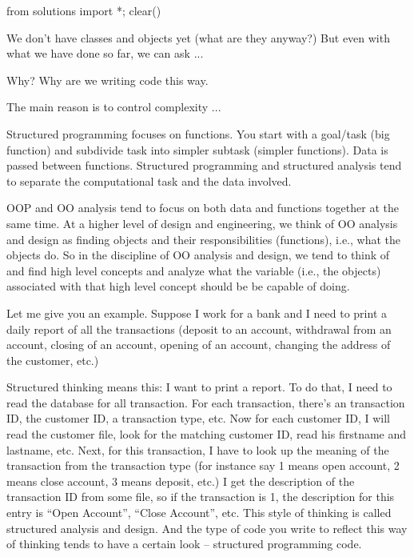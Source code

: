 \begin{python0}
from solutions import *; clear()
\end{python0}

We don't have classes and objects yet (what are they
anyway?) But even with what we have done so far, we can ask ...

Why? Why are we writing code this way.

The main reason is to control complexity ...

Structured programming focuses on functions. You start with a goal/task
(big function) and subdivide task into simpler subtask (simpler
functions). Data is passed between functions. Structured programming and structured
analysis tend to separate the computational task and the data involved.

OOP and OO analysis tend to focus on both data and functions together at
the same time. At a higher level of design and engineering, we think of
OO analysis and design as finding objects and their responsibilities
(functions), i.e., what the objects do. So in the discipline of OO
analysis and design, we tend to think of and find high level concepts
and analyze what the variable (i.e., the objects) associated with that
high level concept should be be capable of doing.

Let me give you an example.
Suppose I work for a bank and I need to print a daily report of all the
transactions (deposit to an account, withdrawal from an account, closing
of an account, opening of an account, changing the address of the
customer, etc.)

Structured thinking means this: I want to print a report. To do that, I need
to read the database for all transaction. For each transaction, there's an
transaction ID, the customer ID, a transaction type, etc. Now for each
customer ID, I will read the customer file, look for the matching customer
ID, read his firstname and lastname, etc. Next, for this transaction, I have
to look up the meaning of the transaction from the transaction type (for
instance say 1 means open account, 2 means close account, 3 means
deposit, etc.) I get the description of the transaction ID from some file, so
if the transaction is 1, the description for this entry is “Open Account”,
“Close Account”, etc. This style of thinking is called structured analysis
and design. And the type of code you write to reflect this way of thinking
tends to have a certain look – structured programming code.

